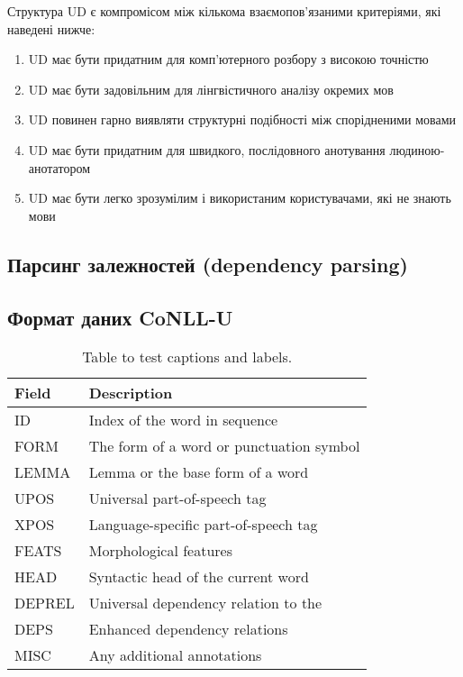 Структура UD є компромісом між кількома взаємопов'язаними критеріями, які наведені нижче:

\begin{enumerate}
    \item UD має бути придатним для комп'ютерного розбору з високою точністю
    \item UD має бути задовільним для лінгвістичного аналізу окремих мов
    \item UD повинен гарно виявляти структурні подібності між спорідненими мовами
    \item UD має бути придатним для швидкого, послідовного анотування людиною-анотатором
    \item UD має бути легко зрозумілим і використаним користувачами, які не знають мови
\end{enumerate}

\subsection{Парсинг залежностей (dependency parsing)}

\subsection{Формат даних CoNLL-U}

\begin{table}[h]
\begin{tabular}{|l|l|}
\hline
  Field   & Description \\ \hline
ID        & Index of the word in sequence \\ \hline
FORM      & The form of a word or punctuation symbol \\ \hline
LEMMA     & Lemma or the base form of a word \\ \hline
UPOS      & Universal part-of-speech tag \\ \hline
XPOS      & Language-specific part-of-speech tag \\ \hline
FEATS     & Morphological features \\ \hline
HEAD      & Syntactic head of the current word \\ \hline
DEPREL    & Universal dependency relation to the \\ \hline
DEPS      & Enhanced dependency relations \\ \hline
MISC      & Any additional annotations \\ \hline
\end{tabular}
\caption{Table to test captions and labels.}
\label{table:1}
\end{table}